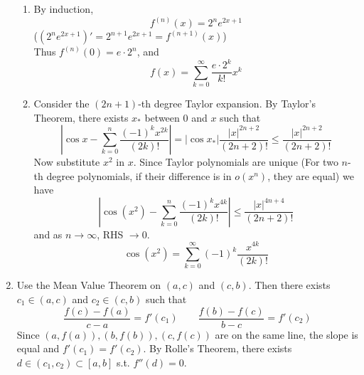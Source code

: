 \documentclass[11pt]{report}
\newcommand{\ra}{\rightarrow}
\newcommand{\abs}[1]{\left|#1\right|}
\begin{document}
\begin{enumerate}
\begin{enumerate}
	\item By induction, $$f^{(n)}(x) = 2^n e^{2x+1}$$
	($(2^n e^{2x+1})' = 2^{n+1}e^{2x+1} = f^{(n+1)}(x)$)\\
	Thus $f^{(n)}(0) = e \cdot 2^n$, and
	$$f(x) = \sum_{k=0}^\infty \frac{e\cdot 2^k }{k!}x^k$$
	\item Consider the $(2n+1)$-th degree Taylor expansion. By Taylor's Theorem, there exists $x_*$ between $0$ and $x$ such that
	$$\abs{\cos x - \sum_{k=0}^n \frac{(-1)^k x^{2k}}{(2k)!}} = \abs{\cos x_*}\frac{\abs{x}^{2n+2}}{(2n+2)!} \leq \frac{\abs{x}^{2n+2}}{(2n+2)!}$$
	Now substitute $x^2$ in $x$. Since Taylor polynomials are unique (For two $n$-th degree polynomials, if their difference is in $o(x^n)$, they are equal) we have
	$$\abs{\cos(x^2) - \sum_{k=0}^n \frac{(-1)^k x^{4k}}{(2k)!}} \leq \frac{\abs{x}^{4n+4}}{(2n+2)!}$$
	and as $n\ra \infty$, RHS $\ra0$.
	$$\cos(x^2) = \sum_{k=0}^\infty (-1)^k \frac{x^{4k}}{(2k)!}$$
\end{enumerate}

\item Use the Mean Value Theorem on $(a, c)$ and $(c, b)$. Then there exists $c_1\in (a, c)$ and $c_2\in (c, b)$ such that 
$$\frac{f(c)-f(a)}{c-a}=f'(c_1)\qquad \frac{f(b)-f(c)}{b-c} = f'(c_2)$$
Since $(a, f(a)), (b, f(b)), (c, f(c))$ are on the same line, the slope is equal and $f'(c_1)=f'(c_2)$. By Rolle's Theorem, there exists $d\in (c_1, c_2)\subset [a, b]$ s.t. $f''(d) =0$.


\end{enumerate}
\end{document}
